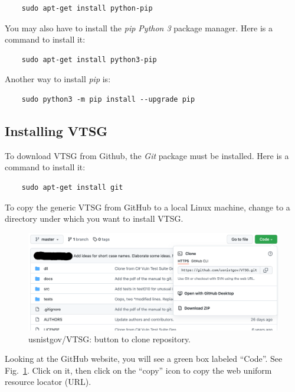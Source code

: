 \begin{verbatim}
    sudo apt-get install python-pip
\end{verbatim}

\noindent You may also have to install the \emph{pip Python 3} package manager.
Here is a command to install it:

\begin{verbatim}
    sudo apt-get install python3-pip
\end{verbatim}

\noindent Another way to install \emph{pip} is:

\begin{verbatim}
    sudo python3 -m pip install --upgrade pip
\end{verbatim}

\subsection{Installing VTSG}

\noindent To download VTSG from Github, the \emph{Git} package must be installed.
Here is a command to install it:

\begin{verbatim}
    sudo apt-get install git
\end{verbatim}

\noindent To copy the generic VTSG from GitHub to a local Linux machine, change to a
directory under which you want to install VTSG.

\begin{figure}[tbp]
  \includegraphics[width=1\linewidth]{fig_clone_tab.png}
  \caption{usnistgov/VTSG: button to clone repository.}
  \label{fig:clone button}
\end{figure}

\noindent Looking at the GitHub website, you will see a green box labeled ``Code''.
See Fig.~\ref{fig:clone button}.
Click on it, then click on the ``copy'' icon to copy the web uniform resource locator
(URL).

